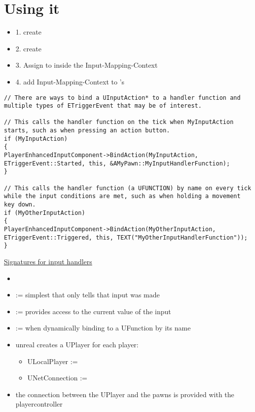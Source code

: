 \section{Using it}
    \begin{itemize}
        \item 1. create 
        \item 2. create 
        \item 3. Assign  to  inside the Input-Mapping-Context
        \item 4. add Input-Mapping-Context to 's 
    \end{itemize}

    \begin{lstlisting}
// There are ways to bind a UInputAction* to a handler function and multiple types of ETriggerEvent that may be of interest.

// This calls the handler function on the tick when MyInputAction starts, such as when pressing an action button.
if (MyInputAction)
{
PlayerEnhancedInputComponent->BindAction(MyInputAction, ETriggerEvent::Started, this, &AMyPawn::MyInputHandlerFunction);
}

// This calls the handler function (a UFUNCTION) by name on every tick while the input conditions are met, such as when holding a movement key down.
if (MyOtherInputAction)
{
PlayerEnhancedInputComponent->BindAction(MyOtherInputAction, ETriggerEvent::Triggered, this, TEXT("MyOtherInputHandlerFunction"));
}
    \end{lstlisting}

    \uline{Signatures for input handlers}
    \begin{itemize}
        \item {}
        \item {} := simplest that only tells that input was made
        \item {} := provides access to the current value of the input
        \item {} := when dynamically binding to a UFunction by its name
    \end{itemize}

    \begin{itemize}
        \item unreal creates a UPlayer for each player:
        \begin{itemize}
            \item ULocalPlayer := 
            \item UNetConnection := 
        \end{itemize}
        \item the connection between the UPlayer and the pawns is provided with the playercontroller
    \end{itemize}

